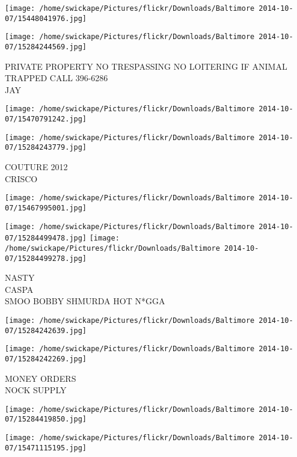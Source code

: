 \documentclass[10pt,letterpaper]{article}
\begin{document}
\texttt{[image: /home/swickape/Pictures/flickr/Downloads/Baltimore 2014-10-07/15448041976.jpg]}

\vspace{0.25in}
\texttt{[image: /home/swickape/Pictures/flickr/Downloads/Baltimore 2014-10-07/15284244569.jpg]}

PRIVATE PROPERTY NO TRESPASSING NO LOITERING IF ANIMAL TRAPPED CALL 396{-}6286\\
JAY\\
\pagebreak

\texttt{[image: /home/swickape/Pictures/flickr/Downloads/Baltimore 2014-10-07/15470791242.jpg]}

\vspace{0.25in}
\texttt{[image: /home/swickape/Pictures/flickr/Downloads/Baltimore 2014-10-07/15284243779.jpg]}

COUTURE 2012\\
CRISCO\\
\pagebreak

\texttt{[image: /home/swickape/Pictures/flickr/Downloads/Baltimore 2014-10-07/15467995001.jpg]}

\vspace{0.25in}
\texttt{[image: /home/swickape/Pictures/flickr/Downloads/Baltimore 2014-10-07/15284499478.jpg]}
\texttt{[image: /home/swickape/Pictures/flickr/Downloads/Baltimore 2014-10-07/15284499278.jpg]}

NASTY\\
CASPA\\
SMOO BOBBY SHMURDA HOT N*GGA\\
\pagebreak

\texttt{[image: /home/swickape/Pictures/flickr/Downloads/Baltimore 2014-10-07/15284242639.jpg]}

\vspace{0.25in}
\texttt{[image: /home/swickape/Pictures/flickr/Downloads/Baltimore 2014-10-07/15284242269.jpg]}

MONEY ORDERS\\
NOCK SUPPLY\\
\pagebreak

\texttt{[image: /home/swickape/Pictures/flickr/Downloads/Baltimore 2014-10-07/15284419850.jpg]}

\vspace{0.25in}
\texttt{[image: /home/swickape/Pictures/flickr/Downloads/Baltimore 2014-10-07/15471115195.jpg]}
\end{document}
